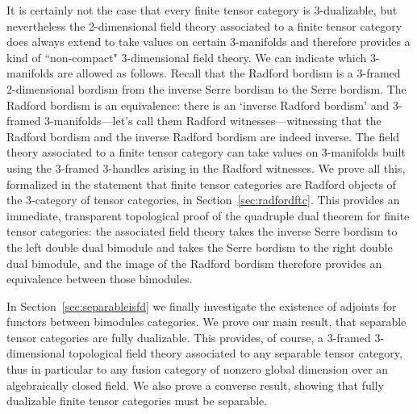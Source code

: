 \documentclass{amsart}
\begin{document}
It is certainly not the case that every finite tensor category is 3-dualizable, but nevertheless the 2-dimensional field theory associated to a finite tensor category does always extend to take values on certain 3-manifolds and therefore provides a kind of ``non-compact" 3-dimensional field theory.  We can indicate which 3-manifolds are allowed as follows.  Recall that the Radford bordism is a 3-framed 2-dimensional bordism from the inverse Serre bordism to the Serre bordism.  The Radford bordism is an equivalence: there is an `inverse Radford bordism' and 3-framed 3-manifolds---let's call them Radford witnesses---witnessing that the Radford bordism and the inverse Radford bordism are indeed inverse.  The field theory associated to a finite tensor category can take values on 3-manifolds built using the 3-framed 3-handles arising in the Radford witnesses.  We prove all this, formalized in the statement that finite tensor categories are Radford objects of the 3-category of tensor categories, in Section~\ref{sec:radfordftc}.  This provides an immediate, transparent topological proof of the quadruple dual theorem for finite tensor categories: the associated field theory takes the inverse Serre bordism to the left double dual bimodule and takes the Serre bordism to the right double dual bimodule, and the image of the Radford bordism therefore provides an equivalence between those bimodules.

In Section~\ref{sec:separableisfd} we finally investigate the existence of adjoints for functors between bimodules categories.  We prove our main result, that separable tensor categories are fully dualizable.  This provides, of course, a 3-framed 3-dimensional topological field theory associated to any separable tensor category, thus in particular to any fusion category of nonzero global dimension over an algebraically closed field.  We also prove a converse result, showing that fully dualizable finite tensor categories must be separable.
\end{document}
